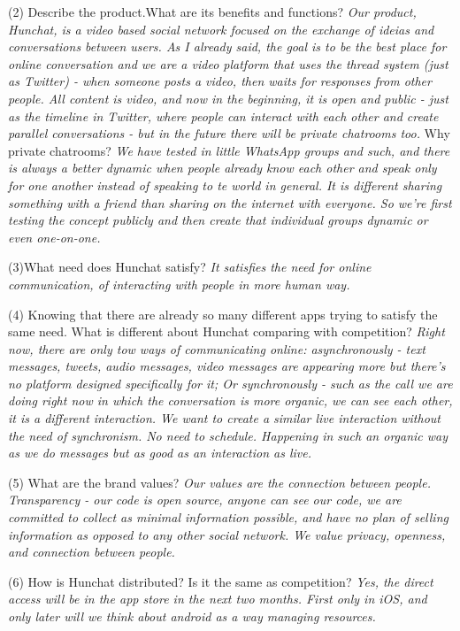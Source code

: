 \documentclass[12pt]{article}
\begin{document}
(2) Describe the product.What are its benefits and functions? \textit{Our product, Hunchat, is a video based social network focused on the exchange of ideias and conversations between users. As I already said, the goal is to be the best place for online conversation and we are a video platform that uses the thread system (just as Twitter) - when someone posts a video, then waits for responses from other people. All content is video, and now in the beginning, it is open and public - just as the timeline in Twitter, where people can interact with each other and create parallel conversations - but in the future there will be private chatrooms too.} Why private chatrooms? \textit{We have tested in little WhatsApp groups and such, and there is always a better dynamic when people already know each other and speak only for one another instead of speaking to te world in general. It is different sharing something with a friend than sharing on the internet with everyone. So we're first testing the concept publicly and then create that individual groups dynamic or even one-on-one.}

(3)What need does Hunchat satisfy? \textit{It satisfies the need for online communication, of interacting with people in more human way.}

(4) Knowing that there are already so many different apps trying to satisfy the same need. What is different about Hunchat comparing with competition?  \textit{Right now, there are only tow ways of communicating online: asynchronously - text messages, tweets, audio messages, video messages are appearing more but there's no platform designed specifically for it; Or synchronously - such as the call we are doing right now in which the conversation is more organic, we can see each other, it is a different interaction. We want to create a similar live interaction without the need of synchronism. No need to schedule. Happening in such an organic way as we do messages but as good as an interaction as live. } 

(5) What are the brand values? \textit{Our values are the connection between people. Transparency - our code is open source, anyone can see our code, we are committed to collect as minimal information possible, and have no plan of selling information as opposed to any other social network. We value privacy, openness, and connection between people.}

(6) How is Hunchat distributed? Is it the same as competition? \textit{Yes, the direct access will be in the app store in the next two months. First only in iOS, and only later will we think about android as a way managing resources.}
\end{document}
